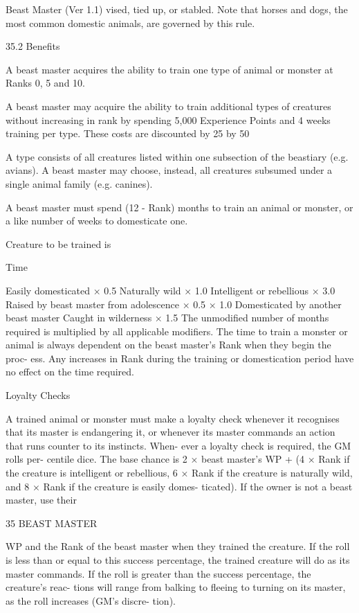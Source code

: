 \begin{Chapter}{Beast Master (Ver 1.1)}
vised,  tied  up,  or  stabled.  Note  that  horses  and 
dogs,  the  most  common  domestic  animals,  are 
governed by this rule. 

35.2 Benefits 

A beast master acquires the ability to train one 
type of animal or monster at Ranks 0, 5 and 10. 

A  beast  master  may  acquire  the  ability  to  train 
additional  types  of  creatures  without  increasing  in 
rank  by  spending  5,000  Experience  Points  and  4 
weeks training per type. These costs are discounted 
by  25%
by 50%

A  type  consists  of  all  creatures  listed  within  one 
subsection  of  the  beastiary  (e.g.  avians).  A  beast 
master may choose, instead, all creatures subsumed 
under a single animal family (e.g. canines). 

A  beast  master  must  spend  (12  -  Rank)  months  to 
train  an  animal  or  monster,  or  a  like  number  of 
weeks to domesticate one. 

Creature to be trained is 

Time 

Easily domesticated 
× 0.5 
Naturally wild 
× 1.0 
Intelligent or rebellious 
 × 3.0 
Raised by beast master from adolescence  × 0.5 
× 1.0 
Domesticated by another beast master 
Caught in wilderness 
× 1.5 
The  unmodified  number  of  months  required  is 
multiplied by all applicable modifiers. The time to 
train  a  monster  or  animal  is  always  dependent  on 
the beast master’s Rank when they begin the proc-
ess.  Any  increases  in  Rank  during  the  training  or 
domestication  period  have  no  effect  on  the  time 
required. 

Loyalty Checks 

A  trained  animal  or  monster  must  make  a  loyalty 
check  whenever  it  recognises  that  its  master  is 
endangering  it,  or  whenever  its  master  commands 
an  action  that  runs  counter  to  its  instincts.  When-
ever a loyalty check is required, the GM rolls per-
centile dice. The base chance is 2 × beast master’s 
WP  +  (4  ×  Rank  if  the  creature  is  intelligent  or 
rebellious,  6  ×  Rank  if  the  creature  is  naturally 
wild, and 8 × Rank if the creature is easily domes-
ticated). If the owner is not a beast master, use their 

35 BEAST MASTER 

WP  and  the  Rank  of  the  beast  master  when  they 
trained the creature. If the roll is less than or equal 
to this success percentage, the trained creature will 
do  as  its  master  commands.  If  the  roll  is  greater 
than  the  success  percentage,  the  creature’s  reac-
tions  will  range  from balking  to  fleeing  to  turning 
on  its  master,  as  the  roll  increases  (GM’s  discre-
tion). 


\end{Chapter}
